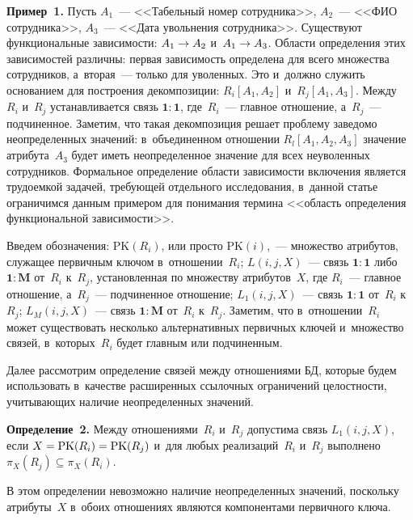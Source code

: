 \begin{multicols}{2}
  \noindent
  \textbf{Пример~1.} Пусть $A_1$~--- <<Табельный номер сотрудника>>,
$A_2$~--- <<ФИО сотрудника>>, $A_3$~--- <<Дата увольнения сотрудника>>.
Существуют функциональные зависимости: $A_1\hm\to A_2$ и~$A_1\hm\to
A_3$. Области определения этих зависимостей различны: первая зависимость
определена для всего множества сотрудников, а~вторая~--- только для уволенных.
Это и~должно служить основанием для построения декомпозиции: $R_i[A_1,
A_2]$ и~$R_j[A_1, A_3]$. Между~$R_i$ и~$R_j$ устанавливается связь
$\mathbf{1}:\mathbf{1}$, где~$R_i$~--- главное отношение, а~$R_j$~---
подчиненное. Заметим, что такая декомпозиция решает проблему заведомо
неопределенных значений: в~объединенном отношении $R_l[A_1, A_2, A_3]$
значение атрибута~$A_3$ будет иметь неопределенное значение для всех
неуволен\-ных сотрудников. Формальное определение области зависимости
включения является трудоемкой задачей, требующей отдельного исследования,
в~данной \mbox{статье} ограничимся данным примером для понимания термина
<<область определения функциональной зависимости>>.

  \medskip

  Введем обозначения: $\mathrm{PK}(R_i)$, или просто $\mathrm{PK}(i)$,~--- множество
атрибутов, служащее первичным ключом в~отношении~$R_i$; $L(i,j,X)$~---
связь $\mathbf{1}:\mathbf{1}$ либо $\mathbf{1}:\mathbf{M}$ от~$R_i$
к~$R_j$, установленная по множеству атрибутов~$X$, где $R_i$~--- главное
отношение, а~$R_j$~--- подчиненное отношение; $L_1(i,j,X)$~--- связь
$\mathbf{1}:\mathbf{1}$ от~$R_i$ к~$R_j$; $L_M(i,j,X)$~--- связь
$\mathbf{1}:\mathbf{M}$ от~$R_i$ к~$R_j$. Заметим, что в~отношении~$R_i$
может существовать несколько альтернативных первичных ключей
и~множество связей, в~которых~$R_i$ будет главным или подчиненным.

  Далее рассмотрим определение связей между отношениями БД, которые
будем использовать в~качестве расширенных ссылочных ограничений
целостности, учитывающих наличие неопределенных значений.


  \smallskip

  \noindent
  \textbf{Определение~2.} Между отношениями~$R_i$ и~$R_j$ допустима
связь $L_1(i,j,X)$, если $X\hm= \mathrm{PK}(R_i) \hm= \mathrm{PK}(R_j)$ и~для любых
реализаций~$R_i$ и~$R_j$ выполнено $\pi_X(R_j)\subseteq \pi_X(R_i)$.


  В этом определении невозможно наличие неопределенных значений,
поскольку атрибуты~$X$ в~обоих отношениях являются компонентами
первичного ключа.

  \smallskip


\end{multicols}
